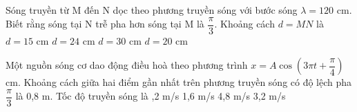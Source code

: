 \PhanI
\setcounter{ex}{0}





\begin{ex}%
Sóng truyền từ M đến N dọc theo phương truyền sóng với bước sóng $\lambda=120$ cm. Biết rằng sóng tại N trễ pha hơn sóng tại M là $\dfrac{\pi}{3}$. Khoảng cách $d=MN$ là
\choice
{$d=15$ cm}
{$d=24$ cm}
{$d=30$ cm}
{\True $d=20$ cm}
\end{ex} 
\begin{ex}%
Một nguồn sóng cơ dao động điều hoà theo phương trình $x=A\cos(3\pi t + \dfrac{\pi}{4})$ cm. Khoảng cách giữa hai điểm gần nhất trên phương truyền sóng có độ lệch pha $\dfrac{\pi}{3}$ là 0,8 m. Tốc độ truyền sóng là
\choice
{,2 m/s}
{1,6 m/s}
{4,8 m/s}
{3,2 m/s}

\end{ex} 


